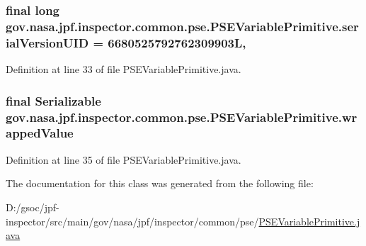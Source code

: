 \subsubsection[{\texorpdfstring{serial\+Version\+U\+ID}{serialVersionUID}}]{\setlength{\rightskip}{0pt plus 5cm}final long gov.\+nasa.\+jpf.\+inspector.\+common.\+pse.\+P\+S\+E\+Variable\+Primitive.\+serial\+Version\+U\+ID = 6680525792762309903L\hspace{0.3cm}{\ttfamily [static]}, {\ttfamily [private]}}\hypertarget{classgov_1_1nasa_1_1jpf_1_1inspector_1_1common_1_1pse_1_1_p_s_e_variable_primitive_afd94fc8a4dde2e565541c4400122f91b}{}\label{classgov_1_1nasa_1_1jpf_1_1inspector_1_1common_1_1pse_1_1_p_s_e_variable_primitive_afd94fc8a4dde2e565541c4400122f91b}


Definition at line 33 of file P\+S\+E\+Variable\+Primitive.\+java.

\subsubsection[{\texorpdfstring{wrapped\+Value}{wrappedValue}}]{\setlength{\rightskip}{0pt plus 5cm}final Serializable gov.\+nasa.\+jpf.\+inspector.\+common.\+pse.\+P\+S\+E\+Variable\+Primitive.\+wrapped\+Value\hspace{0.3cm}{\ttfamily [protected]}}\hypertarget{classgov_1_1nasa_1_1jpf_1_1inspector_1_1common_1_1pse_1_1_p_s_e_variable_primitive_a9765da8fdc3fa98de09d90006a715547}{}\label{classgov_1_1nasa_1_1jpf_1_1inspector_1_1common_1_1pse_1_1_p_s_e_variable_primitive_a9765da8fdc3fa98de09d90006a715547}


Definition at line 35 of file P\+S\+E\+Variable\+Primitive.\+java.



The documentation for this class was generated from the following file\+:\begin{DoxyCompactItemize}
\item 
D\+:/gsoc/jpf-\/inspector/src/main/gov/nasa/jpf/inspector/common/pse/\hyperlink{_p_s_e_variable_primitive_8java}{P\+S\+E\+Variable\+Primitive.\+java}\end{DoxyCompactItemize}
